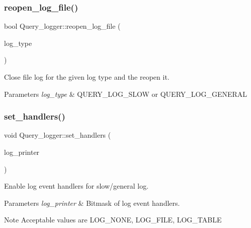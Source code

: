 \subsubsection{\texorpdfstring{reopen\+\_\+log\+\_\+file()}{reopen\_log\_file()}}
{\footnotesize\ttfamily bool Query\+\_\+logger\+::reopen\+\_\+log\+\_\+file (\begin{DoxyParamCaption}\item[{enum\+\_\+log\+\_\+table\+\_\+type}]{log\+\_\+type }\end{DoxyParamCaption})}

Close file log for the given log type and the reopen it.


\begin{DoxyParams}{Parameters}
{\em log\+\_\+type} & Q\+U\+E\+R\+Y\+\_\+\+L\+O\+G\+\_\+\+S\+L\+OW or Q\+U\+E\+R\+Y\+\_\+\+L\+O\+G\+\_\+\+G\+E\+N\+E\+R\+AL \\
\hline
\end{DoxyParams}
\mbox{\label{classQuery__logger_abdae239f31748b1d940e44caadff77d7}} 
\subsubsection{\texorpdfstring{set\+\_\+handlers()}{set\_handlers()}}
{\footnotesize\ttfamily void Query\+\_\+logger\+::set\+\_\+handlers (\begin{DoxyParamCaption}\item[{ulonglong}]{log\+\_\+printer }\end{DoxyParamCaption})}

Enable log event handlers for slow/general log.


\begin{DoxyParams}{Parameters}
{\em log\+\_\+printer} & Bitmask of log event handlers.\\
\hline
\end{DoxyParams}
\begin{DoxyNote}{Note}
Acceptable values are L\+O\+G\+\_\+\+N\+O\+NE, L\+O\+G\+\_\+\+F\+I\+LE, L\+O\+G\+\_\+\+T\+A\+B\+LE 
\end{DoxyNote}
\mbox{\label{classQuery__logger_a52e6c9bf61b1518100757d14df97e500}} 
